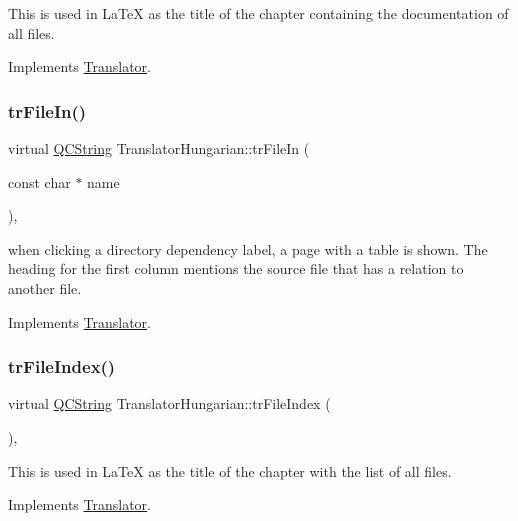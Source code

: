 This is used in La\+TeX as the title of the chapter containing the documentation of all files. 

Implements \mbox{\hyperlink{class_translator}{Translator}}.

\mbox{\label{class_translator_hungarian_a147f0bbde7f3a8869f967f1991fffc74}} 
\subsubsection{\texorpdfstring{trFileIn()}{trFileIn()}}
{\footnotesize\ttfamily virtual \mbox{\hyperlink{class_q_c_string}{Q\+C\+String}} Translator\+Hungarian\+::tr\+File\+In (\begin{DoxyParamCaption}\item[{const char $\ast$}]{name }\end{DoxyParamCaption})\hspace{0.3cm}{\ttfamily [inline]}, {\ttfamily [virtual]}}

when clicking a directory dependency label, a page with a table is shown. The heading for the first column mentions the source file that has a relation to another file. 

Implements \mbox{\hyperlink{class_translator}{Translator}}.

\mbox{\label{class_translator_hungarian_a5c8d9f94d7a001834ad44c836da109da}} 
\subsubsection{\texorpdfstring{trFileIndex()}{trFileIndex()}}
{\footnotesize\ttfamily virtual \mbox{\hyperlink{class_q_c_string}{Q\+C\+String}} Translator\+Hungarian\+::tr\+File\+Index (\begin{DoxyParamCaption}{ }\end{DoxyParamCaption})\hspace{0.3cm}{\ttfamily [inline]}, {\ttfamily [virtual]}}

This is used in La\+TeX as the title of the chapter with the list of all files. 

Implements \mbox{\hyperlink{class_translator}{Translator}}.

